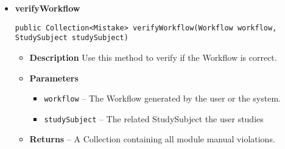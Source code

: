 \documentclass[11pt,a4paper]{report}
\begin{document}
{{{{{{{{{{{\begin{itemize}
{						\begin{lstlisting}[frame=none]
public Module removeModule(Workflow workflow, String moduleName, int semester)
						\end{lstlisting} %
						\begin{itemize}
							\item{
								{\bf  Description}
								Removes a Module from the given Semester of the Workflow.
							}
							\item{
								{\bf  Parameters}
								\begin{itemize}
									\item{\texttt{workflow} -- Workflow to be edited}
									\item{\texttt{moduleName} --Identifier of the Module}
									\item{\texttt{semester} -- The Module's Semester}
								\end{itemize}
							}%
							\item{
								{\bf  Returns}
								 -- The removed Module, null if not found 
							}%
						\end{itemize}
					}%
					\item{ 
						\hypertarget{studyplanning.model.WorkflowOperations.verifyWorkflow(studyplanning.model.workflow.Workflow, studyplanning.model.workflow.StudySubject)}{{\bf  verifyWorkflow}\\}
						\begin{lstlisting}[frame=none]
public Collection<Mistake> verifyWorkflow(Workflow workflow, StudySubject studySubject)
						\end{lstlisting} %
						\begin{itemize}
							\item{
								{\bf  Description}
								Use this method to verify if the Workflow is correct.
							}
							\item{
								{\bf  Parameters}
								\begin{itemize}
									\item{\texttt{workflow} -- The Workflow generated by the user or the system.}
									\item{\texttt{studySubject} -- The related StudySubject the user studies}
								\end{itemize}
							}%
							\item{
								{\bf  Returns} 
								-- A Collection containing all module manual violations. 
							}%
						\end{itemize}
					}%
				\end{itemize}
			}
		}
	}

}}}}}}}}
\end{document}
